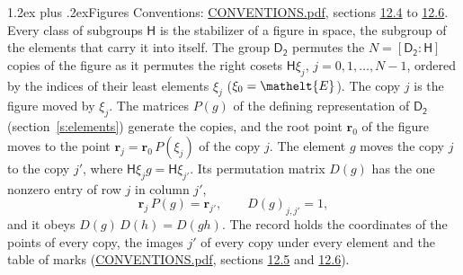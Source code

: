 \documentclass[10pt,a4paper]{article}
\makeatletter
\renewcommand\section{\@startsection{section}{1}{\z@}{-3ex plus -1ex minus -.2ex}%
  {1.2ex plus .2ex}{\normalfont\large\sffamily\bfseries\color{parttitle}}}
\numberwithin{equation}{section}
\newcommand{\eltfont}[1]{{\let\sigma\eltsigma\mathelt{#1}}}
\newcommand{\grp}[1]{\mathsf{#1}}
\newcommand{\cls}[1]{\eltfont{#1}}
\newcommand{\pointr}{\mathbf{r}}
\makeatother
\begin{document}
\section{Figures}\label{s:permutation}
Conventions: \href{../../CONVENTIONS.pdf}{CONVENTIONS.pdf}, sections \href{../../CONVENTIONS.pdf\#conv.12.4}{12.4} to \href{../../CONVENTIONS.pdf\#conv.12.6}{12.6}.
Every class of subgroups $\grp{H}$ is the stabilizer of a figure in space, the subgroup of the elements that carry it into itself. \label{n:local.orbit.size}\label{n:element.coset.least}\label{n:index.coset}The group $\grp{D_{2}}$ permutes the $N = [\grp{D_{2}} : \grp{H}]$ copies of the figure as it permutes the right cosets $\grp{H}\xi_j$, $j = 0, 1, \dots, N - 1$, ordered by the indices of their least elements $\xi_j$ ($\xi_0 = \cls{E}$). The copy $j$ is the figure moved by $\xi_j$. The matrices $P(g)$ of the defining representation of $\grp{D_{2}}$ (section~\ref{s:elements}) generate the copies, and the root point $\pointr_0$ of the figure moves to the point $\pointr_j = \pointr_0\, P(\xi_j)$ of the copy $j$. \label{n:local.coset.image}The element $g$ moves the copy $j$ to the copy $j'$, where $\grp{H}\xi_j g = \grp{H}\xi_{j'}$. \label{n:local.matrix.permutation}Its permutation matrix $D(g)$ has the one nonzero entry of row $j$ in column $j'$,
\begin{equation}\label{e:perm.matrix}\pointr_j\, P(g) = \pointr_{j'}, \qquad D(g)_{j,j'} = 1,\end{equation}
and it obeys $D(g)\, D(h) = D(gh)$. The record holds the coordinates of the points of every copy, the images $j'$ of every copy under every element and the table of marks (\href{../../CONVENTIONS.pdf}{CONVENTIONS.pdf}, sections \href{../../CONVENTIONS.pdf\#conv.12.5}{12.5} and \href{../../CONVENTIONS.pdf\#conv.12.6}{12.6}).
\end{document}

